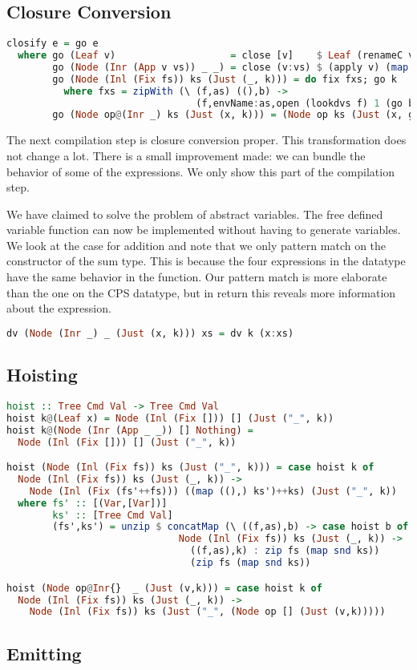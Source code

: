 \subsection{\label{subsection:closconvert2}Closure Conversion}
\begin{lstlisting}[language=Haskell]
closify e = go e
  where go (Leaf v)                    = close [v]    $ Leaf (renameC v)
        go (Node (Inr (App v vs)) _ _) = close (v:vs) $ (apply v) (map renameC vs)
        go (Node (Inl (Fix fs)) ks (Just (_, k))) = do fix fxs; go k
          where fxs = zipWith (\ (f,as) ((),b) ->
                                 (f,envName:as,open (lookdvs f) 1 (go b))) fs ks
        go (Node op@(Inr _) ks (Just (x, k))) = (Node op ks (Just (x, go k)))
\end{lstlisting}

The next compilation step is closure conversion proper. This transformation does not change a lot. There is a small improvement made: we can bundle the behavior of some of the  expressions. We only show this part of the compilation step.

We have claimed to solve the problem of abstract variables. The free defined variable function  can now be implemented without having to generate variables. We look at the case for addition and note that we only pattern match on the constructor of the sum type. This is because the four expressions in the  datatype have the same behavior in the  function. Our pattern match is more elaborate than the one on the \ac{CPS} datatype, but in return this reveals more information about the expression.

\begin{lstlisting}[language=Haskell]
dv (Node (Inr _) _ (Just (x, k))) xs = dv k (x:xs)
\end{lstlisting}

\subsection{\label{subsection:hoist2}Hoisting}
\begin{lstlisting}[language=Haskell]
hoist :: Tree Cmd Val -> Tree Cmd Val
hoist k@(Leaf x) = Node (Inl (Fix [])) [] (Just ("_", k))
hoist k@(Node (Inr (App _ _)) [] Nothing) =
  Node (Inl (Fix [])) [] (Just ("_", k))

hoist (Node (Inl (Fix fs)) ks (Just ("_", k))) = case hoist k of
  Node (Inl (Fix fs)) ks (Just (_, k)) ->
    Node (Inl (Fix (fs'++fs))) ((map ((),) ks')++ks) (Just ("_", k))
  where fs' :: [(Var,[Var])]
        ks' :: [Tree Cmd Val]
        (fs',ks') = unzip $ concatMap (\ ((f,as),b) -> case hoist b of
                              Node (Inl (Fix fs)) ks (Just (_, k)) ->
                                ((f,as),k) : zip fs (map snd ks))
                                (zip fs (map snd ks))

hoist (Node op@Inr{}  _ (Just (v,k))) = case hoist k of
  Node (Inl (Fix fs)) ks (Just (_, k)) ->
    Node (Inl (Fix fs)) ks (Just ("_", (Node op [] (Just (v,k)))))
\end{lstlisting}

\subsection{\label{subsection:emit2}Emitting}
